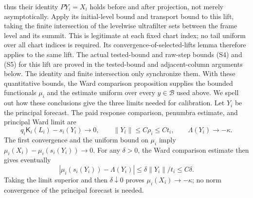 thus their identity $PY_i=X_i$ holds before and after projection,
not merely asymptotically. Apply its initial-level bound and transport
bound to this lift, taking the finite intersection of the levelwise
ultrafilter sets between the frame level and its summit. This is
legitimate at each fixed chart index; no tail uniform over all chart
indices is required. Its convergence-of-selected-lifts lemma therefore
applies to the same lift. The actual tested-bound and raw-step bounds (S4) and (S5) for
this lift are proved in the tested-bound and adjacent-column arguments
below. The identity and finite intersection only synchronize them. With
these quantitative bounds, the
Ward comparison proposition supplies the
bounded functionals $\mu_i$ and the estimate uniform over every
$y\in\mathcal B$ used above. We spell out how these conclusions
give the three limits needed for calibration. Let $Y_i$ be the principal
forecast. The paid response comparison, penumbra estimate, and principal
Ward limit are
\begin{equation}
 q_i\mathsf K_i(L_i)-s_i(Y_i)\longrightarrow0,\qquad
 \|Y_i\|\le C\rho_i\le Ct_i,\qquad
 \Lambda(Y_i)\longrightarrow-\kappa.
 \label{eq:ex-lattice-scribe-principal-response-input}
\end{equation}
The first convergence and the uniform bound on $\mu_i$ imply
$\mu_i(X_i)-\mu_i(s_i(Y_i))\to0$. For any $\delta>0$, the Ward comparison estimate
then gives eventually
\[
 |\mu_i(s_i(Y_i))-\Lambda(Y_i)|
       \le \delta\|Y_i\|/t_i\le C\delta.
\]
Taking the limit superior and then $\delta\downarrow0$ proves
$\mu_i(X_i)\to-\kappa$; no norm convergence of the principal forecast is
needed.

